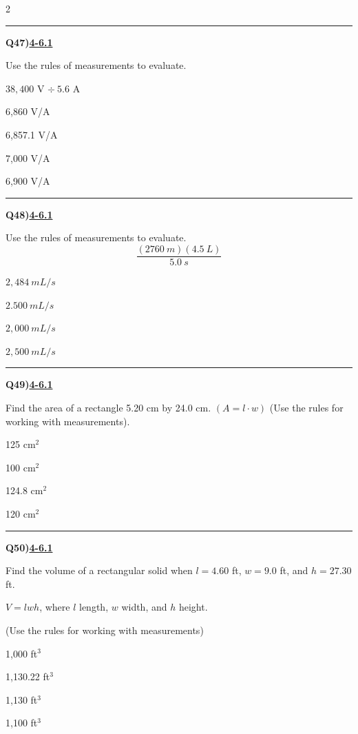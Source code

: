 \documentclass[11pt]{article}
\newenvironment{Qbox}[2]{%
  \par\medskip\noindent\begin{minipage}{\linewidth}%
  \hrule\medskip%
  \textbf{Q#1)}\hfill\textbf{\underline{#2}}\par\smallskip%
}{\par\end{minipage}\par\medskip}
\begin{document}
\begin{multicols}{2}
\begin{Qbox}{47}{4-6.1}
Use the rules of measurements to evaluate.\par\medskip $38{,}400$ V $\div\ 5.6$ A
\begin{choices}
  \item 6,860 V/A
  \item 6,857.1 V/A
  \item 7,000 V/A
  \item 6,900 V/A
\end{choices}
\end{Qbox}

\begin{Qbox}{48}{4-6.1}
Use the rules of measurements to evaluate.\[ \frac{(2760\ m)(4.5\ L)}{5.0\ s} \]
\begin{choices}
  \item $2{,}484\ mL/s$
  \item $2.500\ mL/s$
  \item $2{,}000\ mL/s$
  \item $2{,}500\ mL/s$
\end{choices}
\end{Qbox}

\begin{Qbox}{49}{4-6.1}
Find the area of a rectangle 5.20 cm by 24.0 cm. $(A=l\cdot w)$ (Use the rules for working with measurements).
\begin{choices}
  \item 125 cm$^2$
  \item 100 cm$^2$
  \item 124.8 cm$^2$
  \item 120 cm$^2$
\end{choices}
\end{Qbox}

\begin{Qbox}{50}{4-6.1}
Find the volume of a rectangular solid when $l=4.60$ ft, $w=9.0$ ft, and $h=27.30$ ft.\par\medskip $V=lwh$, where $l$ length, $w$ width, and $h$ height.\par\medskip (Use the rules for working with measurements)
\begin{choices}
  \item 1,000 ft$^3$
  \item 1,130.22 ft$^3$
  \item 1,130 ft$^3$
  \item 1,100 ft$^3$
\end{choices}
\end{Qbox}

\end{multicols}
\end{document}

